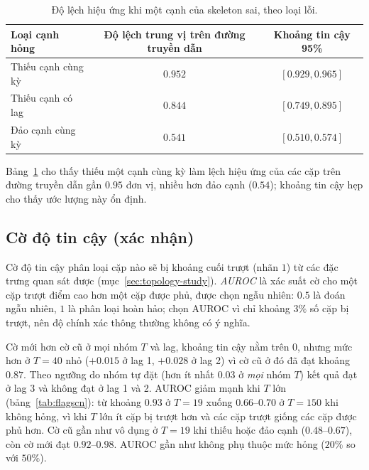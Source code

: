 \begin{table}[H]
\centering\small
\begin{tabular}{lcc}
\toprule
Loại cạnh hỏng & Độ lệch trung vị trên đường truyền dẫn & Khoảng tin cậy 95\%\\
\midrule
Thiếu cạnh cùng kỳ & $0.952$ & $[0.929,0.965]$\\
Thiếu cạnh có lag & $0.844$ & $[0.749,0.895]$\\
Đảo cạnh cùng kỳ & $0.541$ & $[0.510,0.574]$\\
\bottomrule
\end{tabular}
\caption{Độ lệch hiệu ứng khi một cạnh của skeleton sai, theo loại lỗi.}\label{tab:rq43}
\end{table}
Bảng~\ref{tab:rq43} cho thấy thiếu một cạnh cùng kỳ làm lệch hiệu ứng của các cặp trên đường truyền dẫn gần $0.95$ đơn vị, nhiều hơn đảo cạnh ($0.54$); khoảng tin cậy hẹp cho thấy ước lượng này ổn định.

\subsection{Cờ độ tin cậy (xác nhận)}
Cờ độ tin cậy phân loại cặp nào sẽ bị khoảng cuối trượt (nhãn $1$) từ các đặc trưng quan sát được (mục~\ref{sec:topology-study}). \emph{AUROC} là xác suất cờ cho một cặp trượt điểm cao hơn một cặp được phủ, được chọn ngẫu nhiên: $0.5$ là đoán ngẫu nhiên, $1$ là phân loại hoàn hảo; chọn AUROC vì chỉ khoảng $3\%$ số cặp bị trượt, nên độ chính xác thông thường không có ý nghĩa.

\begin{table}[H]
\centering\small

\caption{AUROC của cờ mới, cờ cũ (logistic ba đặc trưng) và độ rộng đơn thuần, theo nhóm $T$ và lag, trên tập kiểm tra chưa dùng cho cờ. KTC: khoảng tin cậy bootstrap theo topology. Ô từ chối được bỏ.}\label{tab:flag}
\end{table}

Cờ mới hơn cờ cũ ở mọi nhóm $T$ và lag, khoảng tin cậy nằm trên $0$, nhưng mức hơn ở $T=40$ nhỏ ($+0.015$ ở lag 1, $+0.028$ ở lag 2) vì cờ cũ ở đó đã đạt khoảng $0.87$. Theo ngưỡng do nhóm tự đặt (hơn ít nhất $0.03$ ở \emph{mọi} nhóm $T$) kết quả đạt ở lag 3 và không đạt ở lag 1 và 2. AUROC giảm mạnh khi $T$ lớn (bảng~\ref{tab:flagscn}): từ khoảng $0.93$ ở $T=19$ xuống $0.66$--$0.70$ ở $T=150$ khi không hỏng, vì khi $T$ lớn ít cặp bị trượt hơn và các cặp trượt giống các cặp được phủ hơn. Cờ cũ gần như vô dụng ở $T=19$ khi thiếu hoặc đảo cạnh ($0.48$--$0.67$), còn cờ mới đạt $0.92$--$0.98$. AUROC gần như không phụ thuộc mức hỏng ($20\%$ so với $50\%$).

